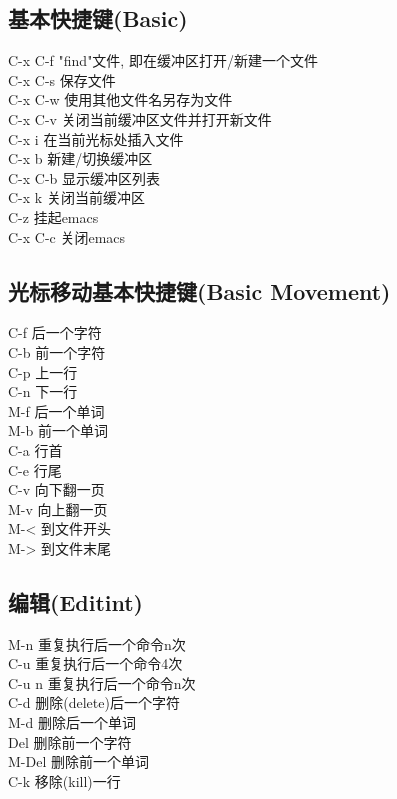 \documentclass[11pt,a4paper,titlepage]{article}
\begin{document}
{\subsection{\kai 基本快捷键(Basic)}
C-x C-f "find"文件, 即在缓冲区打开/新建一个文件\\
C-x C-s 保存文件\\
C-x C-w 使用其他文件名另存为文件\\
C-x C-v 关闭当前缓冲区文件并打开新文件\\
C-x i 在当前光标处插入文件\\
C-x b 新建/切换缓冲区\\
C-x C-b 显示缓冲区列表\\
C-x k 关闭当前缓冲区\\
C-z 挂起emacs\\
C-x C-c 关闭emacs\\

\subsection{\kai 光标移动基本快捷键(Basic Movement)}
C-f 后一个字符\\
C-b 前一个字符\\
C-p 上一行\\
C-n 下一行\\
M-f 后一个单词\\
M-b 前一个单词\\
C-a 行首\\
C-e 行尾\\
C-v 向下翻一页\\
M-v 向上翻一页\\
M-< 到文件开头\\
M-> 到文件末尾\\

\subsection{\kai 编辑(Editint)}
M-n 重复执行后一个命令n次\\
C-u 重复执行后一个命令4次\\
C-u n 重复执行后一个命令n次\\
C-d 删除(delete)后一个字符\\
M-d 删除后一个单词\\
Del 删除前一个字符\\
M-Del 删除前一个单词\\
C-k 移除(kill)一行\\

}
\end{document}
